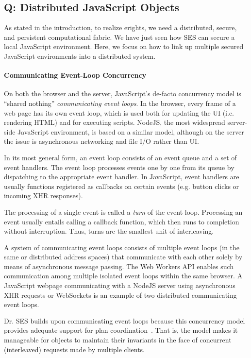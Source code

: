 \documentclass{llncs}
\begin{document}
\subsection{Q: Distributed JavaScript Objects}
\label{Q}

As stated in the introduction, to realize erights, we need a distributed, secure, and persistent computational fabric. We have just seen how SES can secure a local JavaScript environment. Here, we focus on how to link up multiple secured JavaScript environments into a distributed system.


\paragraph{Communicating Event-Loop Concurrency}

On both the browser and the server, JavaScript's de-facto concurrency model is ``shared nothing'' \emph{communicating event loops}. In the browser, every frame of a web page has its own event loop, which is used both for updating the UI (i.e. rendering HTML) and for executing scripts. NodeJS, the most widespread server-side JavaScript environment, is based on a similar model, although on the server the issue is asynchronous networking and file I/O rather than UI.

In its most general form, an event loop consists of an event queue and a set of event handlers. The event loop processes events one by one from its queue by dispatching to the appropriate event handler. In JavaScript, event handlers are usually functions registered as callbacks on certain events (e.g. button clicks or incoming XHR responses).

The processing of a single event is called a \emph{turn} of the event loop. Processing an event usually entails calling a callback function, which then runs to completion without interruption. Thus, turns are the smallest unit of interleaving.

A system of communicating event loops consists of multiple event loops (in the same or distributed address spaces) that communicate with each other solely by means of asynchronous message passing. The Web Workers API enables such communication among multiple isolated event loops within the same browser. A JavaScript webpage communicating with a NodeJS server using asynchronous XHR requests or WebSockets is an example of two distributed communicating event loops.

Dr. SES builds upon communicating event loops because this concurrency model provides adequate support for plan coordination~\cite{miller:strangers}. That is, the model makes it manageable for objects to maintain their invariants in the face of concurrent (interleaved) requests made by multiple clients.
\end{document}
